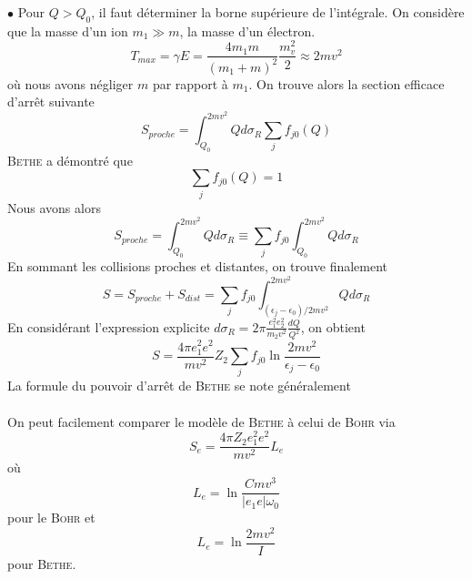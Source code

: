 $\bullet$ Pour $Q>Q_0$, il faut déterminer la borne supérieure de l'intégrale. On considère que 
la masse d'un ion $m_1\gg m$, la masse d'un électron.
\begin{equation}
T_{max} = \gamma E = \frac{4m_1m}{(m_1+m)^2}\frac{m_v^2}{2} \approx 2mv^2
\end{equation}
où nous avons négliger $m$ par rapport à $m_1$. On trouve alors la section efficace 
d'arrêt suivante
\begin{equation}
S_{proche}=\int_{Q_0}^{2mv^2} Q d\sigma_R\sum_jf_{j0}(Q)
\end{equation}
\textsc{Bethe} a démontré que
\begin{equation}
\sum_jf_{j0}(Q)=1
\end{equation}
Nous avons alors
\begin{equation}
S_{proche}=\int_{Q_0}^{2mv^2} Q d\sigma_R\equiv \sum_jf_{j0}\int_{Q_0}^{2mv^2} Q d\sigma_R
\end{equation}
En sommant les collisions proches et distantes, on trouve finalement
\begin{equation}
S=S_{proche}+S_{dist}= \sum_jf_{j0}\int_{(\epsilon_j-\epsilon_0)/2mv^2}^{2mv^2} Q d\sigma_R
\end{equation}
En considérant l'expression explicite $d\sigma_R= 2\pi \frac{e_1^2e_2^2}{m_2v^2}\frac{dQ}{Q^2}$, 
on obtient
\begin{equation}
S=\frac{4\pi e_1^2e^2}{mv^2}Z_2\sum_jf_{j0}\ln{\frac{2mv^2}{\epsilon_j-\epsilon_0}}
\end{equation}
La formule du pouvoir d'arrêt de \textsc{Bethe} se note généralement\\

\ \\
 
On peut facilement comparer le modèle de \textsc{Bethe} à celui de \textsc{Bohr} via 
\begin{equation}
S_e=\frac{4\pi Z_2 e_1^2e^2}{mv^2}L_e
\end{equation}
où 
\begin{equation}
L_e=\ln\frac{Cmv^3}{|e_1e|\omega_0}
\end{equation}
pour le \textsc{Bohr} et 
\begin{equation}
L_e=\ln{\frac{2mv^2}{I}}
\end{equation}
pour \textsc{Bethe}.


